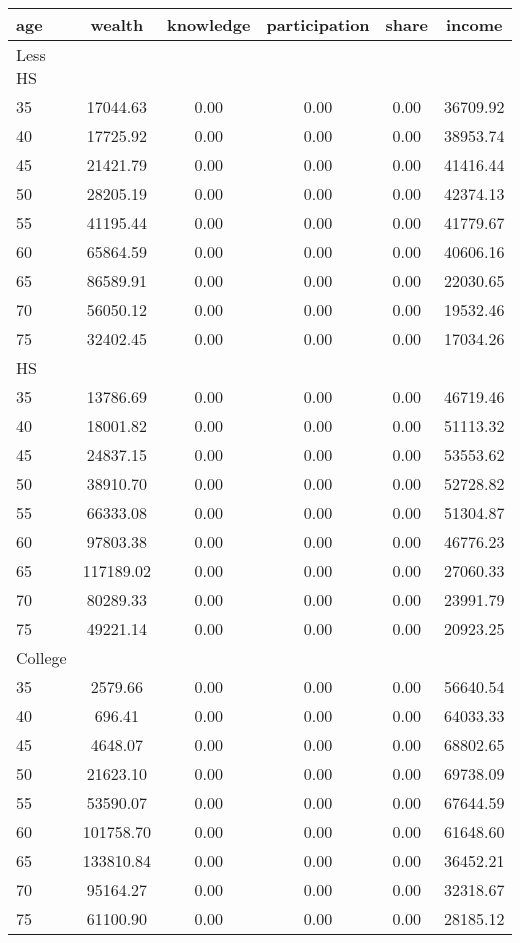  \begin{tabular}{lccccc}
 \hline \hline
  age & wealth & knowledge & participation & share & income \\
 \hline
 Less HS & & & & & \\
 \hline
35 &  17044.63 &      0.00 &      0.00 &      0.00 &  36709.92 \\ 
40 &  17725.92 &      0.00 &      0.00 &      0.00 &  38953.74 \\ 
45 &  21421.79 &      0.00 &      0.00 &      0.00 &  41416.44 \\ 
50 &  28205.19 &      0.00 &      0.00 &      0.00 &  42374.13 \\ 
55 &  41195.44 &      0.00 &      0.00 &      0.00 &  41779.67 \\ 
60 &  65864.59 &      0.00 &      0.00 &      0.00 &  40606.16 \\ 
65 &  86589.91 &      0.00 &      0.00 &      0.00 &  22030.65 \\ 
70 &  56050.12 &      0.00 &      0.00 &      0.00 &  19532.46 \\ 
75 &  32402.45 &      0.00 &      0.00 &      0.00 &  17034.26 \\ 
 \hline
 HS & & & & & \\
 \hline
35 &  13786.69 &      0.00 &      0.00 &      0.00 &  46719.46 \\ 
40 &  18001.82 &      0.00 &      0.00 &      0.00 &  51113.32 \\ 
45 &  24837.15 &      0.00 &      0.00 &      0.00 &  53553.62 \\ 
50 &  38910.70 &      0.00 &      0.00 &      0.00 &  52728.82 \\ 
55 &  66333.08 &      0.00 &      0.00 &      0.00 &  51304.87 \\ 
60 &  97803.38 &      0.00 &      0.00 &      0.00 &  46776.23 \\ 
65 & 117189.02 &      0.00 &      0.00 &      0.00 &  27060.33 \\ 
70 &  80289.33 &      0.00 &      0.00 &      0.00 &  23991.79 \\ 
75 &  49221.14 &      0.00 &      0.00 &      0.00 &  20923.25 \\ 
 \hline
 College & & & & & \\
 \hline
35 &   2579.66 &      0.00 &      0.00 &      0.00 &  56640.54 \\ 
40 &    696.41 &      0.00 &      0.00 &      0.00 &  64033.33 \\ 
45 &   4648.07 &      0.00 &      0.00 &      0.00 &  68802.65 \\ 
50 &  21623.10 &      0.00 &      0.00 &      0.00 &  69738.09 \\ 
55 &  53590.07 &      0.00 &      0.00 &      0.00 &  67644.59 \\ 
60 & 101758.70 &      0.00 &      0.00 &      0.00 &  61648.60 \\ 
65 & 133810.84 &      0.00 &      0.00 &      0.00 &  36452.21 \\ 
70 &  95164.27 &      0.00 &      0.00 &      0.00 &  32318.67 \\ 
75 &  61100.90 &      0.00 &      0.00 &      0.00 &  28185.12 \\ 
 \hline \hline
 \end{tabular}
